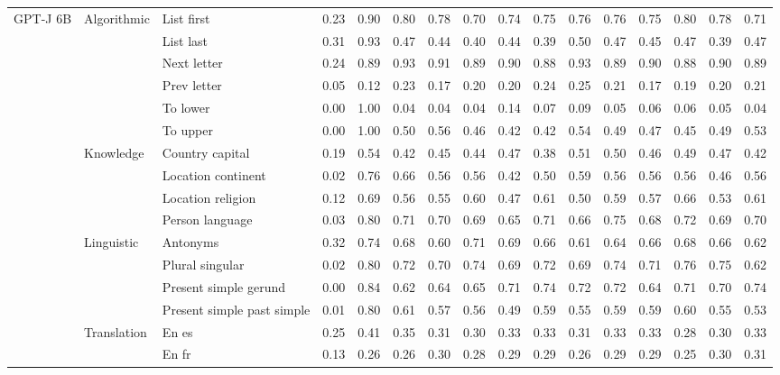 \begin{center}
\begin{longtable}{lllrrrrrrrrrrrrr}
\multirow[t]{18}{*}{GPT-J 6B} & \multirow[t]{6}{*}{Algorithmic} & List first & 0.23 & 0.90 & 0.80 & 0.78 & 0.70 & 0.74 & 0.75 & 0.76 & 0.76 & 0.75 & 0.80 & 0.78 & 0.71 \\
 &  & List last & 0.31 & 0.93 & 0.47 & 0.44 & 0.40 & 0.44 & 0.39 & 0.50 & 0.47 & 0.45 & 0.47 & 0.39 & 0.47 \\
 &  & Next letter & 0.24 & 0.89 & 0.93 & 0.91 & 0.89 & 0.90 & 0.88 & 0.93 & 0.89 & 0.90 & 0.88 & 0.90 & 0.89 \\
 &  & Prev letter & 0.05 & 0.12 & 0.23 & 0.17 & 0.20 & 0.20 & 0.24 & 0.25 & 0.21 & 0.17 & 0.19 & 0.20 & 0.21 \\
 &  & To lower & 0.00 & 1.00 & 0.04 & 0.04 & 0.04 & 0.14 & 0.07 & 0.09 & 0.05 & 0.06 & 0.06 & 0.05 & 0.04 \\
 &  & To upper & 0.00 & 1.00 & 0.50 & 0.56 & 0.46 & 0.42 & 0.42 & 0.54 & 0.49 & 0.47 & 0.45 & 0.49 & 0.53 \\
\cline{2-16}
 & \multirow[t]{4}{*}{Knowledge} & Country capital & 0.19 & 0.54 & 0.42 & 0.45 & 0.44 & 0.47 & 0.38 & 0.51 & 0.50 & 0.46 & 0.49 & 0.47 & 0.42 \\
 &  & Location continent & 0.02 & 0.76 & 0.66 & 0.56 & 0.56 & 0.42 & 0.50 & 0.59 & 0.56 & 0.56 & 0.56 & 0.46 & 0.56 \\
 &  & Location religion & 0.12 & 0.69 & 0.56 & 0.55 & 0.60 & 0.47 & 0.61 & 0.50 & 0.59 & 0.57 & 0.66 & 0.53 & 0.61 \\
 &  & Person language & 0.03 & 0.80 & 0.71 & 0.70 & 0.69 & 0.65 & 0.71 & 0.66 & 0.75 & 0.68 & 0.72 & 0.69 & 0.70 \\
\cline{2-16}
 & \multirow[t]{4}{*}{Linguistic} & Antonyms & 0.32 & 0.74 & 0.68 & 0.60 & 0.71 & 0.69 & 0.66 & 0.61 & 0.64 & 0.66 & 0.68 & 0.66 & 0.62 \\
 &  & Plural singular & 0.02 & 0.80 & 0.72 & 0.70 & 0.74 & 0.69 & 0.72 & 0.69 & 0.74 & 0.71 & 0.76 & 0.75 & 0.62 \\
 &  & Present simple gerund & 0.00 & 0.84 & 0.62 & 0.64 & 0.65 & 0.71 & 0.74 & 0.72 & 0.72 & 0.64 & 0.71 & 0.70 & 0.74 \\
 &  & Present simple past simple & 0.01 & 0.80 & 0.61 & 0.57 & 0.56 & 0.49 & 0.59 & 0.55 & 0.59 & 0.59 & 0.60 & 0.55 & 0.53 \\
\cline{2-16}
 & \multirow[t]{4}{*}{Translation} & En es & 0.25 & 0.41 & 0.35 & 0.31 & 0.30 & 0.33 & 0.33 & 0.31 & 0.33 & 0.33 & 0.28 & 0.30 & 0.33 \\
 &  & En fr & 0.13 & 0.26 & 0.26 & 0.30 & 0.28 & 0.29 & 0.29 & 0.26 & 0.29 & 0.29 & 0.25 & 0.30 & 0.31 \\

\end{longtable}
\end{center}
